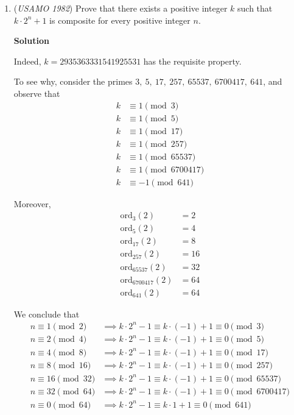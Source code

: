 \begin{enumerate}
 


	\item (\textit{USAMO 1982}) Prove that there exists a positive integer $k$ such that $k\cdot2^n+1$ is composite for every positive integer $n$.


 



\textbf{Solution}

Indeed, $\boxed{k=2935363331541925531}$ has the requisite property.

 To see why, consider the primes $3,\ 5,\ 17,\ 257,\ 65537,\ 6700417,\ 641$, and observe that 
 \begin{align*}k&\equiv 1\pmod{3}\\ k&\equiv 1\pmod{5}\\ k&\equiv 1\pmod{17}\\ k&\equiv 1\pmod{257}\\ k&\equiv 1\pmod{65537}\\ k&\equiv 1\pmod{6700417}\\ k&\equiv -1\pmod{641}\end{align*}


 Moreover, 
 \begin{align*}\text{ord}_{3}\left(2\right)&=2\\ \text{ord}_{5}\left(2\right)&=4\\ \text{ord}_{17}\left(2\right)&=8\\ \text{ord}_{257}\left(2\right)&=16\\ \text{ord}_{65537}\left(2\right)&=32\\ \text{ord}_{6700417}\left(2\right)&=64\\ \text{ord}_{641}\left(2\right)&=64\end{align*}


 We conclude that 
 \begin{align*}n\equiv 1\pmod{2}&\implies k\cdot 2^{n}-1\equiv k\cdot\left(-1\right)+1\equiv 0\pmod{3}\\ n\equiv 2\pmod{4}&\implies k\cdot 2^{n}-1\equiv k\cdot\left(-1\right)+1\equiv 0\pmod{5}\\ n\equiv 4\pmod{8}&\implies k\cdot 2^{n}-1\equiv k\cdot\left(-1\right)+1\equiv 0\pmod{17}\\ n\equiv 8\pmod{16}&\implies k\cdot 2^{n}-1\equiv k\cdot\left(-1\right)+1\equiv 0\pmod{257}\\ n\equiv 16\pmod{32}&\implies k\cdot 2^{n}-1\equiv k\cdot\left(-1\right)+1\equiv 0\pmod{65537}\\ n\equiv 32\pmod{64}&\implies k\cdot 2^{n}-1\equiv k\cdot\left(-1\right)+1\equiv 0\pmod{6700417}\\ n\equiv 0\pmod{64}&\implies k\cdot 2^{n}-1\equiv k\cdot1+1\equiv 0\pmod{641}\end{align*}



\end{enumerate}
